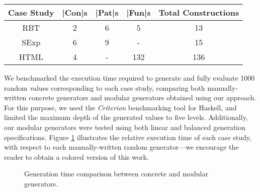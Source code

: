 \begin{table}[H]
  \begin{tabular}{||c||c||c||c||c||}
    \hline
    Case Study & |Con|s & |Pat|s & |Fun|s & Total Constructions \\ \hline
    \hline
    RBT        & 2      & 6      & 5      & 13                  \\ \hline
    SExp       & 6      & 9      & -      & 15                  \\ \hline
    HTML       & 4      & -      & 132    & 136                 \\ \hline
  \end{tabular}
\end{table}

We benchmarked the execution time required to generate and fully evaluate 1000
random values corresponding to each case study, comparing both manually-written
concrete generators and modular generators obtained using our approach.
%
For this purpose, we used the \emph{Criterion} benchmarking tool for Haskell,
and limited the maximum depth of the generated values to five levels.
%
Additionally, our modular generators were tested using both linear and balanced
generation specifications.
%
Figure \ref{fig:times} illustrates the relative execution time of each case
study, with respect to each manually-written random generator---we encourage the
reader to obtain a colored version of this work.

\begin{figure}[b]
  \centering
  \caption{Generation time comparison between concrete and modular generators.}
  \label{fig:times}
\end{figure}

